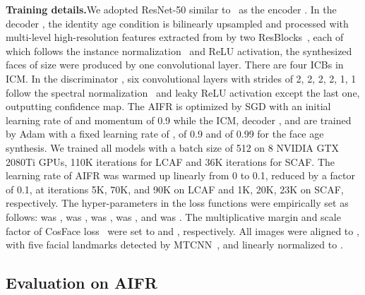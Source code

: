 \noindent\textbf{Training details.}\quad We adopted ResNet-50 similar to~\cite{deng2019arcface} as the encoder . In the decoder , the identity age condition is bilinearly upsampled and processed with multi-level high-resolution features extracted from  by two ResBlocks~\cite{he2016deep}, each of which follows the instance normalization~\cite{ulyanov2016instance} and ReLU activation, the synthesized faces of size  were produced by one  convolutional layer. There are four ICBs in ICM. In the discriminator , six convolutional layers with strides of 2, 2, 2, 2, 1, 1 follow the spectral normalization~\cite{miyato2018spectral} and leaky ReLU activation except the last one, outputting  confidence map. The AIFR is optimized by SGD with an initial learning rate of  and momentum of 0.9 while the ICM, decoder , and  are trained by Adam with a fixed learning rate of ,  of 0.9 and  of 0.99 for the face age synthesis. We trained all models with a batch size of 512 on 8 NVIDIA GTX 2080Ti GPUs, 110K iterations for LCAF and 36K iterations for SCAF. The learning rate of AIFR was warmed up linearly from 0 to 0.1, reduced by a factor of 0.1, at iterations 5K, 70K, and 90K on LCAF and 1K, 20K, 23K on SCAF, respectively. The hyper-parameters in the loss functions were empirically set as follows:  was ,  was ,  was ,  was , and  was . The multiplicative margin and scale factor of CosFace loss~\cite{wang2018cosface} were set to  and , respectively. All images were aligned to , with five facial landmarks detected by MTCNN~\cite{zhang2016joint}, and linearly normalized to .

\subsection{Evaluation on AIFR}

